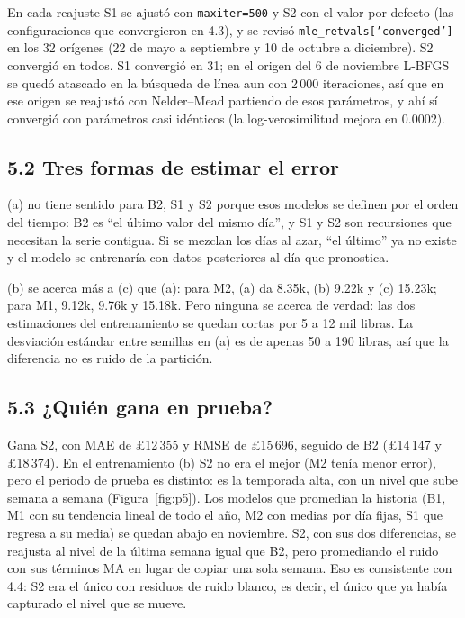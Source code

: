 \documentclass[11pt]{article}
\newcommand{\tabla}[1]{}
\begin{document}
En cada reajuste S1 se ajustó con \texttt{maxiter=500} y S2 con el valor por defecto (las configuraciones que convergieron en 4.3), y se revisó \texttt{mle\_retvals['converged']} en los 32 orígenes (22 de mayo a septiembre y 10 de octubre a diciembre). S2 convergió en todos. S1 convergió en 31; en el origen del 6 de noviembre L-BFGS se quedó atascado en la búsqueda de línea aun con 2\,000 iteraciones, así que en ese origen se reajustó con Nelder--Mead partiendo de esos parámetros, y ahí sí convergió con parámetros casi idénticos (la log-verosimilitud mejora en 0.0002).

\subsection*{5.2 Tres formas de estimar el error}
\begin{table}[H]\centering\small
\caption{MAE y RMSE en miles de libras. (a) validación cruzada aleatoria de 5 folds sobre el entrenamiento, media y desviación estándar sobre 10 semillas; (b) origen móvil semanal dentro del entrenamiento (orígenes del 1 de mayo al 25 de septiembre); (c) periodo de prueba con origen móvil semanal (orígenes del 2 de octubre al 4 de diciembre).}\label{tab:val}
\resizebox{\textwidth}{!}{\tabla{p5_validacion}}
\end{table}

(a) no tiene sentido para B2, S1 y S2 porque esos modelos se definen por el orden del tiempo: B2 es ``el último valor del mismo día'', y S1 y S2 son recursiones que necesitan la serie contigua. Si se mezclan los días al azar, ``el último'' ya no existe y el modelo se entrenaría con datos posteriores al día que pronostica.

(b) se acerca más a (c) que (a): para M2, (a) da 8.35k, (b) 9.22k y (c) 15.23k; para M1, 9.12k, 9.76k y 15.18k. Pero ninguna se acerca de verdad: las dos estimaciones del entrenamiento se quedan cortas por 5 a 12 mil libras. La desviación estándar entre semillas en (a) es de apenas 50 a 190 libras, así que la diferencia no es ruido de la partición.

\subsection*{5.3 ¿Quién gana en prueba?}
Gana S2, con MAE de £12\,355 y RMSE de £15\,696, seguido de B2 (£14\,147 y £18\,374). En el entrenamiento (b) S2 no era el mejor (M2 tenía menor error), pero el periodo de prueba es distinto: es la temporada alta, con un nivel que sube semana a semana (Figura~\ref{fig:p5}). Los modelos que promedian la historia (B1, M1 con su tendencia lineal de todo el año, M2 con medias por día fijas, S1 que regresa a su media) se quedan abajo en noviembre. S2, con sus dos diferencias, se reajusta al nivel de la última semana igual que B2, pero promediando el ruido con sus términos MA en lugar de copiar una sola semana. Eso es consistente con 4.4: S2 era el único con residuos de ruido blanco, es decir, el único que ya había capturado el nivel que se mueve.
\end{document}
